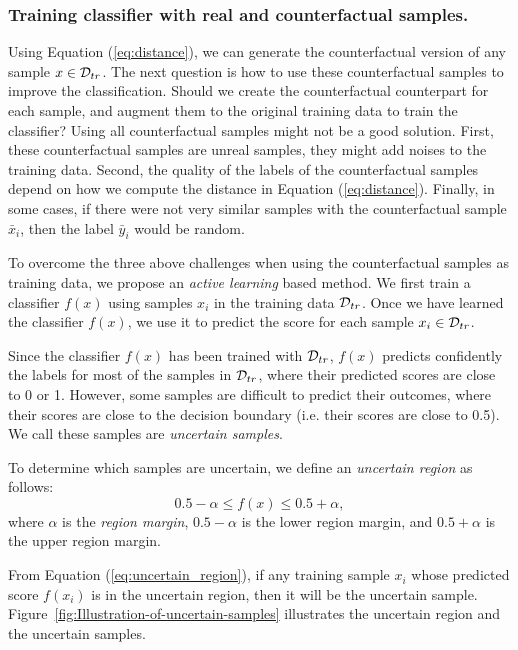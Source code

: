 \subsubsection{Training classifier with real and counterfactual samples.\label{subsec:Training-classifier-with}}

Using Equation (\ref{eq:distance}), we can generate the counterfactual
version of any sample $x\in{\cal D}_{tr}$. The next question is how
to use these counterfactual samples to improve the classification.
Should we create the counterfactual counterpart for each sample, and
augment them to the original training data to train the classifier?
Using all counterfactual samples might not be a good solution. First,
these counterfactual samples are unreal samples, they might add noises
to the training data. Second, the quality of the labels of the counterfactual
samples depend on how we compute the distance in Equation (\ref{eq:distance}).
Finally, in some cases, if there were not very similar samples with
the counterfactual sample $\bar{x}_{i}$, then the label $\bar{y}_{i}$
would be random.

To overcome the three above challenges when using the counterfactual
samples as training data, we propose an \textit{active learning} based
method. We first train a classifier $f(x)$ using samples $x_{i}$
in the training data ${\cal D}_{tr}$. Once we have learned the classifier
$f(x)$, we use it to predict the score for each sample $x_{i}\in{\cal D}_{tr}$.

Since the classifier $f(x)$ has been trained with ${\cal D}_{tr}$,
$f(x)$ predicts confidently the labels for most of the samples in
${\cal D}_{tr}$, where their predicted scores are close to 0 or 1.
However, some samples are difficult to predict their outcomes, where
their scores are close to the decision boundary (i.e. their scores
are close to 0.5). We call these samples are \textit{uncertain samples}.

To determine which samples are uncertain, we define an \textit{uncertain
region} as follows:
\begin{equation}
0.5-\alpha\leq f(x)\leq0.5+\alpha,\label{eq:uncertain_region}
\end{equation}
where $\alpha$ is the \textit{region margin}, $0.5-\alpha$ is the
lower region margin, and $0.5+\alpha$ is the upper region margin.

From Equation (\ref{eq:uncertain_region}), if any training sample
$x_{i}$ whose predicted score $f(x_{i})$ is in the uncertain region,
then it will be the uncertain sample. Figure~\ref{fig:Illustration-of-uncertain-samples}
illustrates the uncertain region and the uncertain samples.

